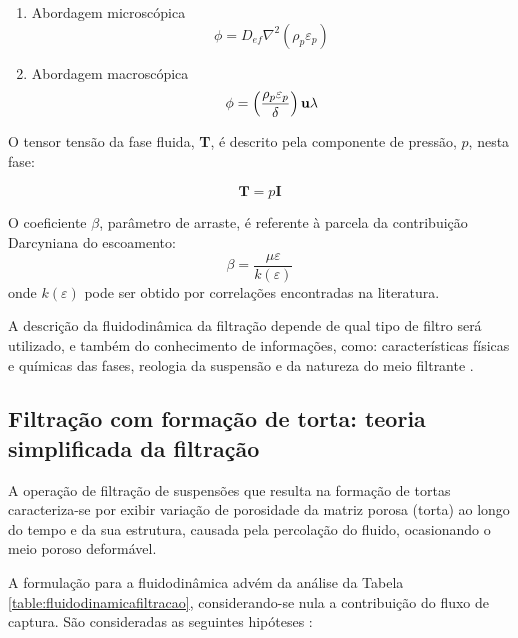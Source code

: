 \begin{enumerate}
\item[] Abordagem microscópica
  \begin{equation}
    \phi = D_{ef} \nabla^2(\rho_p\varepsilon_p)
  \end{equation}
  
\item[] Abordagem macroscópica
  \begin{equation}
    \phi = \left(\frac{\rho_p\varepsilon_p}{\delta} \right)\textbf{u}{}\lambda
  \end{equation}
\end{enumerate}

O tensor tensão da fase fluida, \textbf{T}, é descrito pela componente de
pressão, $p$, nesta fase:

\begin{equation}
  \label{eq:tensortensao}
  \textbf{T} = p \textbf{I}
\end{equation}

O coeficiente $\beta$, parâmetro de arraste, é referente à parcela da
contribuição Darcyniana do escoamento:
\begin{equation}
  \label{eq:parametroB}
  \beta = \frac{\mu\varepsilon}{k(\varepsilon)}
\end{equation}
onde $k(\varepsilon)$ pode ser obtido por correlações encontradas na literatura.

A descrição da fluidodinâmica da filtração depende de qual tipo de filtro será
utilizado, e também do conhecimento de informações, como: características
físicas e químicas das fases, reologia da suspensão e da natureza do meio
filtrante .

\subsection{Filtração com formação de torta: teoria simplificada da filtração}

A operação de filtração de suspensões que resulta na formação de tortas
caracteriza-se por exibir variação de porosidade da matriz porosa (torta) ao
longo do tempo e da sua estrutura, causada pela percolação do fluido,
ocasionando o meio poroso deformável.

A formulação para a fluidodinâmica advém da análise da Tabela
\ref{table:fluidodinamicafiltracao}, considerando-se nula a contribuição do
fluxo de captura. São consideradas as seguintes hipóteses
:

